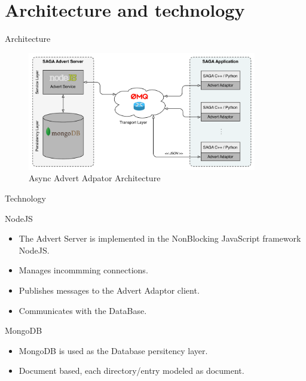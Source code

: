 \documentclass{beamer}
\begin{document}
  \section{Architecture and technology}
    \begin{frame}{Architecture}
      \begin{figure}
        \includegraphics[width=10cm]{new_technology_overview}
        \caption{Async Advert Adpator Architecture}  
      \end{figure}
    \end{frame}
    
    \begin{frame}{Technology}
      \begin{block}{NodeJS}
        \begin{itemize}
          \item The Advert Server is implemented in the NonBlocking JavaScript framework NodeJS.
          \item Manages incommming connections.
          \item Publishes messages to the Advert Adaptor client.
          \item Communicates with the DataBase.
        \end{itemize}
      \end{block}
      
      \begin{block}{MongoDB}
        \begin{itemize}
          \item MongoDB is used as the Database persitency layer.
          \item Document based, each directory/entry modeled as document.
        \end{itemize}
      \end{block}
    \end{frame}
    
\end{document}
